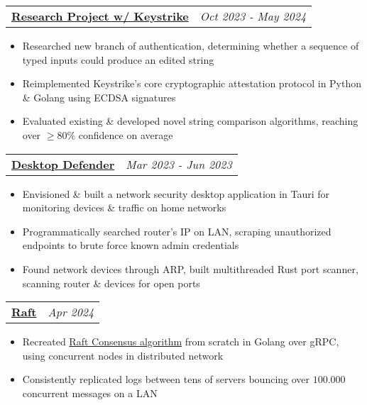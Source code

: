 \documentclass{article}
\makeatletter
\newcommand{\resumeProject}[2]{
\vspace{3mm}
    \begin{tabular*}{0.99\textwidth}[t]{l@{\extracolsep{\fill}}r}
        \textbf{#1} & \textit{\normalsize{#2}}
    \end{tabular*}
    \vspace{-2.5mm}
}
\newcommand{\resumeItemListStart}{\begin{itemize}[leftmargin=*,labelsep=1mm,itemsep=-1.1mm]\normalsize}
\newcommand{\resumeItemListEnd}{\end{itemize}\vspace{-\baselineskip}}
\makeatother
\begin{document}
\resumeProject
{\href{https://skemman.is/bitstream/1946/47651/1/Reykjavik_University_Keystrike_Final_Report.pdf}{Research Project w/ Keystrike  \footnotesize{\faFile}}}
  {Oct 2023 - May 2024}
\resumeItemListStart

\item Researched new branch of authentication, determining whether a sequence of typed inputs could produce an edited string 
\item Reimplemented Keystrike's core cryptographic attestation protocol in Python \& Golang using ECDSA signatures
\item Evaluated existing \& developed novel string comparison algorithms, reaching over $\ge 80\%$ confidence on average
\resumeItemListEnd

\resumeProject 
{\href{https://github.com/DesktopDefender/DesktopDefender}{Desktop Defender \footnotesize{\faGithub}}}
  {Mar 2023 - Jun 2023}
\resumeItemListStart
\item Envisioned \& built a network security desktop application in Tauri for monitoring devices \& traffic on home networks
\item Programmatically searched router's IP on LAN, scraping unauthorized endpoints to brute force known admin credentials
\item Found network devices through ARP, built multithreaded Rust port scanner, scanning router \& devices for open ports
\resumeItemListEnd

\resumeProject
{\href{https://github.com/lsig/raft}{Raft \footnotesize{\faGithub}}}
	{Apr 2024}
\resumeItemListStart
\item Recreated \href{https://raft.github.io/}{Raft Consensus algorithm} from scratch in Golang over gRPC, using concurrent nodes in distributed network
	\item Consistently replicated logs between tens of servers bouncing over $100.000$ concurrent messages on a LAN
\resumeItemListEnd
\end{document}
